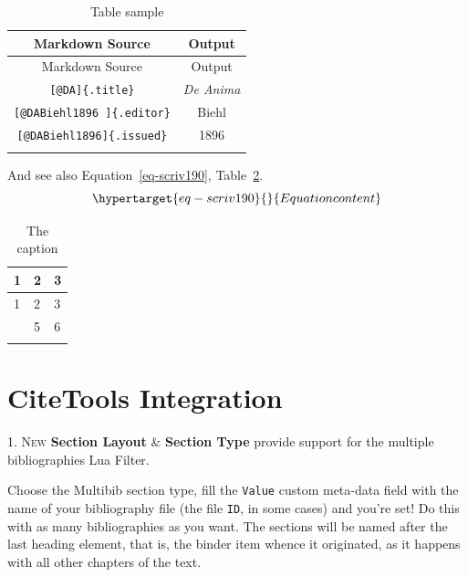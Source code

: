 \documentclass[
  12pt,
  a4paper,
  oneside,
  titlepage,
  toclink=all,
  toc=bibliography]{scrbook}
\theoremstyle{plain}
\theoremstyle{plain}
\theoremstyle{definition}
\theoremstyle{definition}
\theoremstyle{plain}
\theoremstyle{plain}
\theoremstyle{plain}
\theoremstyle{definition}
\theoremstyle{remark}
\begin{document}
\hypertarget{tbl-scriv189}{}
\begin{longtable}[]{@{}cc@{}}
\toprule\noalign{}
Markdown Source & Output \\
\midrule\noalign{}
\endfirsthead
\toprule\noalign{}
Markdown Source & Output \\
\midrule\noalign{}
\endhead
\bottomrule\noalign{}
\endlastfoot
\texttt{{[}@DA{]}\{.title\}} & \emph{De Anima} \\
\texttt{{[}@DABiehl1896\ {]}\{.editor\}} & Biehl \\
\texttt{{[}@DABiehl1896{]}\{.issued\}} & 1896 \\
\caption{\label{tbl-scriv189}Table sample}\tabularnewline
\end{longtable}

And see also
\protect\hypertarget{cite_58}{}{\label{cite_58}Equation~\ref{eq-scriv190}},
\protect\hypertarget{cite_59}{}{\label{cite_59}Table~\ref{tbl-scriv191}}.\\
\begin{equation}\protect\hypertarget{eq-scriv190}{}{Equation content
}\label{eq-scriv190}\end{equation}

\hypertarget{tbl-scriv191}{}
\begin{longtable}[]{@{}lll@{}}
\toprule\noalign{}
1 & 2 & 3 \\
\midrule\noalign{}
\endfirsthead
\toprule\noalign{}
1 & 2 & 3 \\
\midrule\noalign{}
\endhead
\bottomrule\noalign{}
\endlastfoot
4 & 5 & 6 \\
\caption{\label{tbl-scriv191}The caption}\tabularnewline
\end{longtable}

\hypertarget{sec-scriv192}{%
\section{CiteTools Integration}\label{sec-scriv192}}

\protect\hypertarget{scriv192}{}{}

\protect\hypertarget{scriv193}{}{} \textsc{1. New} \textbf{Section
Layout} \& \textbf{Section Type} provide support for the multiple
bibliographies Lua Filter.

Choose the Multibib section type, fill the \texttt{Value} custom
meta-data field with the name of your bibliography file (the file
\texttt{ID}, in some cases) and you're set! Do this with as many
bibliographies as you want. The sections will be named after the last
heading element, that is, the binder item whence it originated, as it
happens with all other chapters of the text.
\end{document}

